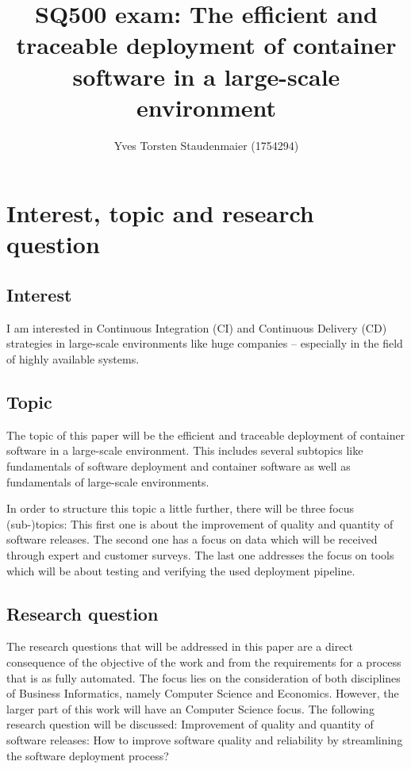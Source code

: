 \documentclass{article}
\begin{document}
\title{SQ500 exam: The efficient and traceable deployment of container software in a large-scale environment}
\author{Yves Torsten Staudenmaier (1754294)}
\maketitle

\tableofcontents
\newpage
\listoftables
\newpage

\section{Interest, topic and research question}
\subsection{Interest}
I am interested in Continuous Integration (CI) and Continuous Delivery (CD) strategies in large-scale environments like huge companies -- especially in the field of highly available systems.
\subsection{Topic}
The topic of this paper will be the efficient and traceable deployment of container software in a large-scale environment. This includes several subtopics like fundamentals of software deployment and container software as well as fundamentals of large-scale environments. \par
In order to structure this topic a little further, there will be three focus (sub-)topics: This first one is about the improvement of quality and quantity of software releases. The second one has a focus on data which will be received through expert and customer surveys. The last one addresses the focus on tools which will be about testing and verifying the used deployment pipeline. 
\subsection{Research question}
The research questions that will be addressed in this paper are a direct consequence of the objective of the work and from the requirements for a process that is as fully automated. The focus lies on the consideration of both disciplines of Business Informatics, namely Computer Science and Economics. However, the larger part of this work will have an Computer Science focus. The following research question will be discussed: Improvement of quality and quantity of software releases: How to improve software quality and reliability by streamlining the software deployment process?
\end{document}
